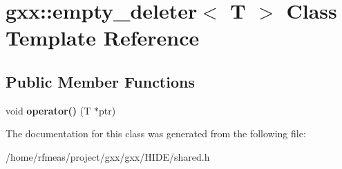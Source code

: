 \hypertarget{classgxx_1_1empty__deleter}{}\section{gxx\+:\+:empty\+\_\+deleter$<$ T $>$ Class Template Reference}
\label{classgxx_1_1empty__deleter}
\subsection*{Public Member Functions}
\begin{DoxyCompactItemize}
\item 
void {\bfseries operator()} (T $\ast$ptr)\hypertarget{classgxx_1_1empty__deleter_a27c1bb67f041dc169acebfae5f358cdf}{}\label{classgxx_1_1empty__deleter_a27c1bb67f041dc169acebfae5f358cdf}

\end{DoxyCompactItemize}


The documentation for this class was generated from the following file\+:\begin{DoxyCompactItemize}
\item 
/home/rfmeas/project/gxx/gxx/\+H\+I\+D\+E/shared.\+h\end{DoxyCompactItemize}
